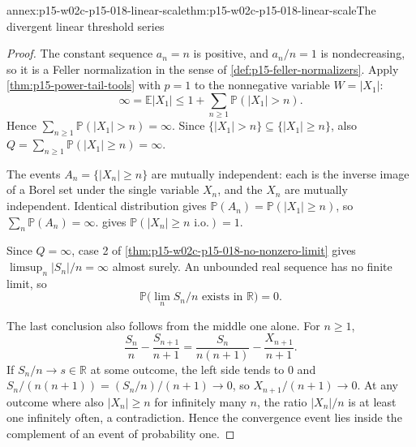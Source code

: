 \begin{annexitem}{annex:p15-w02c-p15-018-linear-scale}{thm:p15-w02c-p15-018-linear-scale}{The divergent linear threshold series}
\begin{proof}
The constant sequence \(a_n=n\) is positive, and \(a_n/n=1\) is
nondecreasing, so it is a Feller normalization in the sense of
\cref{def:p15-feller-normalizers}. Apply
\cref{thm:p15-power-tail-tools} with \(p=1\) to the nonnegative variable
\(W=|X_1|\):
\[
 \infty=\mathbb E|X_1|\leq1+\sum_{n\geq1}\mathbb P(|X_1|>n).
\]
Hence \(\sum_{n\geq1}\mathbb P(|X_1|>n)=\infty\). Since
\(\{|X_1|>n\}\subseteq\{|X_1|\geq n\}\), also
\(Q=\sum_{n\geq1}\mathbb P(|X_1|\geq n)=\infty\).

The events \(A_n=\{|X_n|\geq n\}\) are mutually independent: each is
the inverse image of a Borel set under the single variable \(X_n\), and
the \(X_n\) are mutually independent. Identical distribution gives
\(\mathbb P(A_n)=\mathbb P(|X_1|\geq n)\), so
\(\sum_n\mathbb P(A_n)=\infty\).
 gives
\(\mathbb P(|X_n|\geq n\text{ i.o.})=1\).

Since \(Q=\infty\), case 2 of
\cref{thm:p15-w02c-p15-018-no-nonzero-limit} gives
\(\limsup_n|S_n|/n=\infty\) almost surely. An unbounded real sequence
has no finite limit, so
\[
 \mathbb P\bigl(\lim_nS_n/n\text{ exists in }\mathbb R\bigr)=0.
\]

The last conclusion also follows from the middle one alone. For
\(n\geq1\),
\[
 \frac{S_n}{n}-\frac{S_{n+1}}{n+1}
   =\frac{S_n}{n(n+1)}-\frac{X_{n+1}}{n+1}.
\]
If \(S_n/n\to s\in\mathbb R\) at some outcome, the left side tends to
\(0\) and \(S_n/(n(n+1))=(S_n/n)/(n+1)\to0\), so
\(X_{n+1}/(n+1)\to0\). At any outcome where also \(|X_n|\geq n\) for
infinitely many \(n\), the ratio \(|X_n|/n\) is at least one infinitely
often, a contradiction. Hence the convergence event lies inside the
complement of an event of probability one.
\end{proof}
\end{annexitem}

